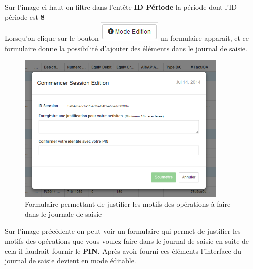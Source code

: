 \documentclass[12pt,a4paper]{report}
\begin{document}
Sur l'image ci-haut on filtre dans l'entête \textbf{ID Période} la période dont l'ID période est \textbf{8 }
\\
\newpage
Lorsqu'on clique sur le bouton \includegraphics[scale=0.7]{pic/ModeEdition.png}  un formulaire apparait, et ce formulaire donne la possibilité d'ajouter des éléments dans le journal de saisie. 
\begin{figure}[h]
\begin{center}
\includegraphics[width=10cm]{pic/FigEdition.png}
\end{center}
\caption{Formulaire permettant de justifier les motifs des opérations à faire dans le journale de saisie}
\label{Formulaire permettant de justifier les motifs des opérations à faire dans le journale de saisie}
\end{figure}

Sur l'image précédente on peut voir un formulaire qui permet de justifier les motifs des opérations que vous voulez faire dans le journal de saisie en suite de cela il faudrait fournir le \textbf{PIN}.
Après avoir fourni ces éléments l'interface du journal de saisie devient en mode éditable.
 
\end{document}

